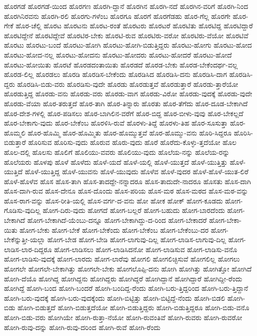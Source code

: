 {ಹೊರಗಡೆ
ಹೊರಗಡೆ-ಯಿಂದ
ಹೊರಗಣ
ಹೊರಗಿ-ದ್ದಾನೆ
ಹೊರಗಿನ
ಹೊರಗಿ-ನದೆ
ಹೊರಗಿನ-ವರಿಗೆ
ಹೊರಗಿ-ನಿಂದ
ಹೊರಗಿನಿರವನು
ಹೊರಗಿ-ರಲಿ
ಹೊರಗು-ಗಳೆಂಬ
ಹೊರಗೂ
ಹೊರಗೆ
ಹೊರಗೆಡಹು
ಹೊರ-ಗೆಲ್ಲ
ಹೊರಗೇ
ಹೊರ-ಗೇಕೆ
ಹೊರ-ಚೆಲ್ಲಿ
ಹೊರಟ
ಹೊರಟನು
ಹೊರಟ-ರಂತೆ
ಹೊರಟರು
ಹೊರಟರೆ
ಹೊರಟಿತು
ಹೊರಟಿದ್ದ
ಹೊರಟಿದ್ದಾರೆ
ಹೊರಟಿದ್ದೇನೆ
ಹೊರಟಿದ್ದೇವೆ
ಹೊರಟಿರ-ಬೇಕು
ಹೊರಟಿ-ರುವ
ಹೊರಟಿರು-ವರೋ
ಹೊರಟಿರು-ವೆಯೋ
ಹೊರಟಿವೆ
ಹೊರಟು
ಹೊರಟು-ಬಂದೆ
ಹೊರಟು-ಹೋಗಿ
ಹೊರಟು-ಹೋಗಿ-ಬಿಡುತ್ತಿದ್ದರು
ಹೊರಟು-ಹೋಗು
ಹೊರಟು-ಹೋದ
ಹೊರಟು-ಹೋದ-ನಲ್ಲ
ಹೊರಟು-ಹೋದನು
ಹೊರಟು-ಹೋದರು
ಹೊರಟು-ಹೋದರೆ
ಹೊರಟು-ಹೋದೆ
ಹೊರಟು-ಹೋಯಿತು
ಹೊರಟೆ
ಹೊರಡದಂತಾಯಿತು
ಹೊರಡದೆ
ಹೊರಡ-ಬೇಕು
ಹೊರಡ-ಬೇಕೆಂದರ್ಥ-ವಲ್ಲ
ಹೊರಡ-ಲಿಲ್ಲ
ಹೊರಡಲು
ಹೊರಡಿ
ಹೊರಡಿಸ-ಬೇಕೆಂದು
ಹೊರಡಿಸಿದ
ಹೊರಡಿಸಿ-ದನು
ಹೊರಡಿಸಿ-ದಾಗ
ಹೊರಡಿಸಿ-ದ್ದರು
ಹೊರಡಿಸಿ-ಬಿಡು-ವರು
ಹೊರಡಿಸು-ವುದೇ
ಹೊರಡು
ಹೊರಡುತ್ತವೆ
ಹೊರಡುತ್ತಾರೆ
ಹೊರಡು-ತ್ತಾರೆಯೋ
ಹೊರಡುತ್ತಿದ್ದ
ಹೊರಡು-ವನು
ಹೊರಡು-ವರು
ಹೊರಡು-ವಾಗ
ಹೊರಡು-ವಿರೋ
ಹೊರಡು-ವುದಕ್ಕೆ
ಹೊರಡು-ವುದೇ
ಹೊರಡು-ವೆಯಾ
ಹೊರ-ತರುತ್ತದೆ
ಹೊರ-ತಾಗಿ
ಹೊರ-ತಿನ್ನಾರು
ಹೊರತು
ಹೊರ-ತೆಗೆದು
ಹೊರ-ದೂಡ-ಬೇಕಾಗಿದೆ
ಹೊರ-ದೇಶ-ಗಳಲ್ಲಿ
ಹೊರ-ಪಡಿಸಲು
ಹೊರ-ಬಾಗಿಲಿನ-ವರೆಗೆ
ಹೊರ-ಬಿದ್ದ
ಹೊರ-ಬೀಳು-ವುವು
ಹೊರ-ಬೇಕಲ್ಲದೆ
ಹೊರ-ಬೇಕಾಗು-ವುದು
ಹೊರ-ಬೇಕೆಂಬ
ಹೊರಳಿಸಿ-ರುವೆ
ಹೊರಳು-ತಿದ್ದೆ
ಹೊರಳು-ತಿಹ
ಹೊರ-ಸೂಸುತ್ತಾ
ಹೊರ-ಹೊಮ್ಮಲಿ
ಹೊರ-ಹೊಮ್ಮಿ
ಹೊರ-ಹೊಮ್ಮಿತು
ಹೊರ-ಹೊಮ್ಮುತ್ತವೆ
ಹೊರ-ಹೊಮ್ಮು-ವನು
ಹೊರಿ-ಸಿದ್ದರೂ
ಹೊರಿಸಿ-ಬಿಡುತ್ತಾರೆ
ಹೊರಿಸುವ
ಹೊರಿಸು-ವುದು
ಹೊರುವ
ಹೊರು-ವುದು
ಹೊರೆ
ಹೊರೆದು-ಕೊಳ್ಳು-ತ್ತದೆಯೋ
ಹೊಲ
ಹೊಲ-ದಲ್ಲಿ
ಹೊಲಸು
ಹೊಲಿಗೆ
ಹೊಲಿಯು-ವವರು
ಹೊಲಿಯು-ವುದು
ಹೊಲೆಯ-ನನ್ನು
ಹೊಲೆಯ-ರನ್ನು
ಹೊಲೆಯರು
ಹೊಳಪು
ಹೊಳೆ
ಹೊಳೆದು
ಹೊಳೆ-ಯದೆ
ಹೊಳೆ-ಯಲ್ಲಿ
ಹೊಳೆ-ಯುತ್ತದೆ
ಹೊಳೆ-ಯುತ್ತಿತ್ತು
ಹೊಳೆ-ಯುತ್ತಿದೆ
ಹೊಳೆ-ಯುತ್ತಿದ್ದ
ಹೊಳೆ-ಯುವನು
ಹೊಳೆ-ಯುವುದು
ಹೊಳೆವ
ಹೊಳೆ-ವುದರ
ಹೊಳೆ-ಹೊಳೆ-ಯುತ-ಲಿರೆ
ಹೊಳೆ-ಹೊಳೆವ
ಹೊಸ
ಹೊಸ-ತಾಗಿ
ಹೊಸ-ತಾದದ್ದೇ-ನನ್ನಾದರೂ
ಹೊಸ-ತಾದುದೇ-ನಾದರೂ
ಹೊಸತು
ಹೊಸ-ದಾಗಿ
ಹೊಸ-ದಾಗಿ-ರುವ
ಹೊಸ-ದೇನೂ
ಹೊಸ-ದೊಂದು
ಹೊಸ-ಪರಿಯ
ಹೊಸ-ಮಠ
ಹೊಸ-ಮಠದ
ಹೊಸ-ಮಠ-ವನ್ನು
ಹೊಸ-ರಾಗ-ವನ್ನು
ಹೊಸ-ರೀತಿ-ಯಲ್ಲಿ
ಹೊಸ-ವರ್ಗ-ದ-ವನು
ಹೋ
ಹೋಕ
ಹೋಕ್
ಹೋಗ-ಕೂಡದು
ಹೋಗ-ಗೊಡಿಸು-ವುದಿಲ್ಲ
ಹೋಗ-ದಿರು-ವುದು
ಹೋಗದೆ
ಹೋಗ-ಬಲ್ಲರೆ
ಹೋಗ-ಬಹುದು
ಹೋಗ-ಬಾರದೆಂದು
ಹೋಗ-ಬೇಕಾಗಿದೆ
ಹೋಗ-ಬೇಕಾಗಿದೆ-ಯೆಂಬು-ದನ್ನೂ
ಹೋಗ-ಬೇಕಾಗಿದ್ದು-ದ-ರಿಂದ
ಹೋಗ-ಬೇಕಾದರೆ
ಹೋಗ-ಬೇಕಾ-ಯಿತು
ಹೋಗ-ಬೇಕು
ಹೋಗ-ಬೇಕೆ
ಹೋಗ-ಬೇಕೆಂದು
ಹೋಗ-ಬೇಕೆಂಬ
ಹೋಗ-ಬೇಕೆಂಬು-ದರ
ಹೋಗ-ಬೇಕೆನ್ನುತ್ತೀ-ಯಲ್ಲಾ
ಹೋಗ-ಬೇಡ
ಹೋಗ-ಬೇಡಿ
ಹೋಗ-ಲಾಗುವು-ದಿಲ್ಲ
ಹೋಗ-ಲಾಡಿಸ-ಲಾಗುವು-ದಿಲ್ಲ
ಹೋಗ-ಲಾಡಿಸ-ಲಾರ-ದಿದ್ದರೂ
ಹೋಗ-ಲಾಡಿಸಲು
ಹೋಗ-ಲಾಡಿಸಿದನೋ
ಹೋಗ-ಲಾಡಿಸುವ
ಹೋಗ-ಲಾಡಿಸು-ವನೊ
ಹೋಗ-ಲಾಡಿಸು-ವುದಕ್ಕೆ
ಹೋಗ-ಲಾರದು
ಹೋಗ-ಲಾರೆವು
ಹೋಗಲಿ
ಹೋಗಲಿಚ್ಛಿಸುವೆ
ಹೋಗಲಿಲ್ಲ
ಹೋಗಲು
ಹೋಗಲೇ
ಹೋಗಲೇ-ಬೇಕಾಗಿತ್ತು
ಹೋಗಲೇ-ಬೇಕು
ಹೋಗಲೊಪ್ಪಿ-ದನು
ಹೋಗಿ
ಹೋಗಿತ್ತು
ಹೋಗಿತ್ತೋ
ಹೋಗಿದೆ
ಹೋಗಿ-ದೆಯೊ
ಹೋಗಿದ್ದ
ಹೋಗಿದ್ದನು
ಹೋಗಿದ್ದರು
ಹೋಗಿದ್ದರೆ
ಹೋಗಿದ್ದಾನೆ
ಹೋಗಿದ್ದಾರೆ
ಹೋಗಿದ್ದೀ-ರೆಂದು
ಹೋಗಿದ್ದೆ
ಹೋಗಿ-ಬಂದ
ಹೋಗಿ-ಬಂದರೆ
ಹೋಗಿ-ಬಂದಿದ್ದ-ರೆಂದು
ಹೋಗಿ-ಬರು-ತ್ತಿದ್ದರಿಂದ
ಹೋಗಿ-ಬರು-ತ್ತಿದ್ದಾನೆ
ಹೋಗಿ-ಬರು-ವುದಕ್ಕೆ
ಹೋಗಿ-ಬರು-ವುದಕ್ಕೆಂದು
ಹೋಗಿ-ಬಿಟ್ಟಿತ್ತು
ಹೋಗಿ-ಬಿಟ್ಟಿದ್ದೆ-ನೆಂದು
ಹೋಗಿ-ಬಿಡಲಿ
ಹೋಗಿ-ಬಿಡು
ಹೋಗಿ-ಬಿಡುತ್ತದೆ
ಹೋಗಿ-ಬಿಡುತ್ತದೆಯೋ
ಹೋಗಿ-ಬಿಡುತ್ತಿದ್ದರು
ಹೋಗಿ-ಬಿಡುತ್ತಿದ್ದರೂ
ಹೋಗಿ-ಬಿಡು-ವನೊ
ಹೋಗಿ-ಬಿಡು-ವರು
ಹೋಗಿಯೇ
ಹೋಗಿ-ರುತ್ತಾ-ನೆಯೋ
ಹೋಗಿ-ರುವಂತಿವೆ
ಹೋಗಿ-ರುವರು
ಹೋಗಿ-ರುವರೋ
ಹೋಗಿ-ರುವು-ದನ್ನು
ಹೋಗಿ-ರುವು-ದರಿಂದ
ಹೋಗಿ-ರುವೆ
ಹೋಗಿ-ರೆಂದು
}
